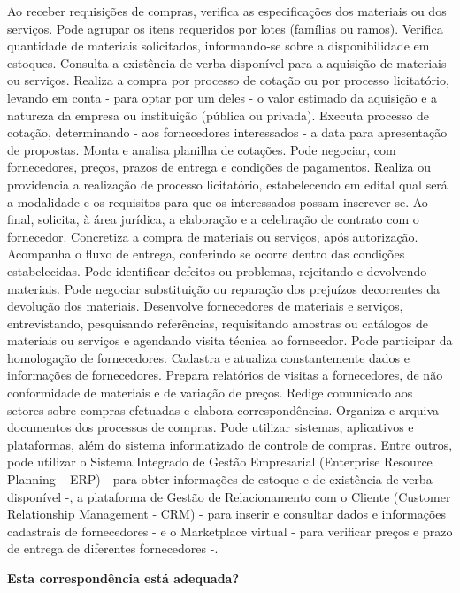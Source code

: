 \documentclass[
]{article}
\begin{document}
Ao receber requisições de compras, verifica as especificações dos
materiais ou dos serviços. Pode agrupar os itens requeridos por lotes
(famílias ou ramos). Verifica quantidade de materiais solicitados,
informando-se sobre a disponibilidade em estoques. Consulta a existência
de verba disponível para a aquisição de materiais ou serviços. Realiza a
compra por processo de cotação ou por processo licitatório, levando em
conta - para optar por um deles - o valor estimado da aquisição e a
natureza da empresa ou instituição (pública ou privada). Executa
processo de cotação, determinando - aos fornecedores interessados - a
data para apresentação de propostas. Monta e analisa planilha de
cotações. Pode negociar, com fornecedores, preços, prazos de entrega e
condições de pagamentos. Realiza ou providencia a realização de processo
licitatório, estabelecendo em edital qual será a modalidade e os
requisitos para que os interessados possam inscrever-se. Ao final,
solicita, à área jurídica, a elaboração e a celebração de contrato com o
fornecedor. Concretiza a compra de materiais ou serviços, após
autorização. Acompanha o fluxo de entrega, conferindo se ocorre dentro
das condições estabelecidas. Pode identificar defeitos ou problemas,
rejeitando e devolvendo materiais. Pode negociar substituição ou
reparação dos prejuízos decorrentes da devolução dos materiais.
Desenvolve fornecedores de materiais e serviços, entrevistando,
pesquisando referências, requisitando amostras ou catálogos de materiais
ou serviços e agendando visita técnica ao fornecedor. Pode participar da
homologação de fornecedores. Cadastra e atualiza constantemente dados e
informações de fornecedores. Prepara relatórios de visitas a
fornecedores, de não conformidade de materiais e de variação de preços.
Redige comunicado aos setores sobre compras efetuadas e elabora
correspondências. Organiza e arquiva documentos dos processos de
compras. Pode utilizar sistemas, aplicativos e plataformas, além do
sistema informatizado de controle de compras. Entre outros, pode
utilizar o Sistema Integrado de Gestão Empresarial (Enterprise Resource
Planning -- ERP) - para obter informações de estoque e de existência de
verba disponível -, a plataforma de Gestão de Relacionamento com o
Cliente (Customer Relationship Management - CRM) - para inserir e
consultar dados e informações cadastrais de fornecedores - e o
Marketplace virtual - para verificar preços e prazo de entrega de
diferentes fornecedores -.

\begin{Form}
\textbf{Esta correspondência está adequada?} \\ 
\end{Form}
\end{document}

